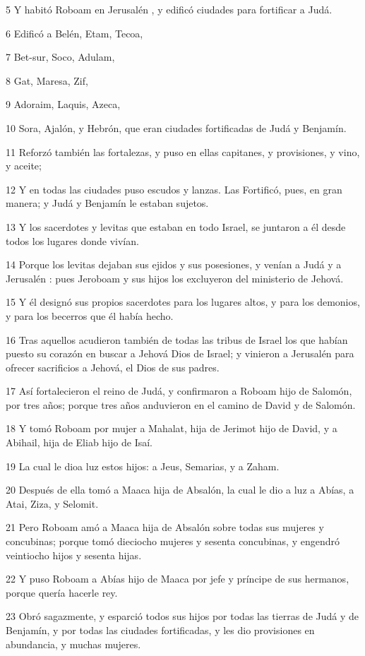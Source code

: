 \par 5 Y habitó Roboam en Jerusalén , y edificó ciudades para fortificar a Judá.
\par 6 Edificó a Belén, Etam, Tecoa,
\par 7 Bet-sur, Soco, Adulam,
\par 8 Gat, Maresa, Zif,
\par 9 Adoraim, Laquis, Azeca,
\par 10 Sora, Ajalón, y  Hebrón, que eran ciudades fortificadas de Judá y Benjamín.
\par 11 Reforzó también las fortalezas, y puso en ellas capitanes, y provisiones, y vino, y aceite;
\par 12 Y en todas las ciudades puso escudos y lanzas. Las Fortificó, pues, en gran manera; y Judá y Benjamín le estaban sujetos.
\par 13 Y los sacerdotes y levitas que estaban en todo Israel, se juntaron a él desde todos los lugares donde vivían.
\par 14 Porque los levitas dejaban sus ejidos y sus posesiones, y venían a Judá y a Jerusalén : pues Jeroboam y sus hijos los excluyeron del ministerio de Jehová.
\par 15 Y él designó sus propios sacerdotes para los lugares altos, y para los demonios, y para los becerros que él había hecho. 
\par 16 Tras aquellos acudieron también de todas las tribus de Israel los que habían puesto su corazón en buscar a Jehová Dios de Israel; y vinieron a Jerusalén  para ofrecer sacrificios a Jehová, el Dios de sus padres.
\par 17 Así fortalecieron el reino de Judá, y confirmaron a Roboam hijo de Salomón, por tres años; porque tres años anduvieron en el camino de David y de Salomón.
\par 18 Y tomó Roboam por mujer a Mahalat, hija de Jerimot hijo de David, y a Abihail, hija de Eliab hijo de Isaí.
\par 19 La cual le dioa luz estos hijos: a Jeus, Semarias, y a Zaham.
\par 20 Después de ella tomó a Maaca hija de Absalón, la cual le dio a luz a Abías, a Atai, Ziza, y Selomit.
\par 21 Pero Roboam amó a Maaca hija de Absalón sobre todas sus mujeres y concubinas; porque tomó dieciocho mujeres y sesenta concubinas, y engendró veintiocho hijos y sesenta hijas.
\par 22 Y puso Roboam a Abías hijo de Maaca por jefe y príncipe de sus hermanos, porque quería hacerle rey.
\par 23 Obró sagazmente, y esparció todos sus hijos por todas las tierras de Judá y de Benjamín, y por todas las ciudades fortificadas, y les dio provisiones en abundancia, y muchas mujeres.

